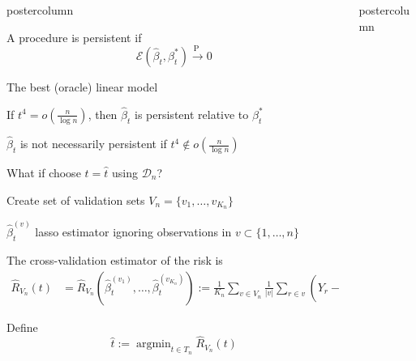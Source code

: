 \documentclass[final]{beamer}
\DeclareMathOperator*{\argmin}{argmin}
\newcommand{\alo}[1]{\textcolor{orangemain}{#1}}
\newcommand{\alr}[1]{\textcolor{redmain}{#1}}
\newcommand{\tCV}{\widehat{t}}
\newcommand{\cvriskN}[2]{\hat{R}_{#1}\left( #2\right)}
\renewcommand{\hat}{\widehat}
\newcommand{\vsp}{\vspace{.2in}}
\newlength{\columnheight}
\begin{document}
\begin{frame}
\begin{columns}
\begin{column}{.49\textwidth}
\begin{beamercolorbox}[center,wd=\textwidth]{postercolumn}
\begin{minipage}[T]{.96\textwidth}
{                \vsp
                A procedure is \alo{persistent} if
                \[
                \mathcal{E}(\hat\beta_t,\beta_t^*) \stackrel{\textrm{P }}{\rightarrow} 0
                \]
            \vsp
            \begin{block}{The best (oracle) linear model}
              
              If $t^4 = o \left(\frac{n}{\log n}
              \right)$, then $\hat\beta_t$ is
              persistent relative to $\beta^*_t$

              \vsp
              $\hat\beta_t$ is \alo{not necessarily}
              persistent if $t^4 \notin o\left(\frac{n}{\log
                    n} \right)$ 
              
              \vsp
              What if  \alr{choose $t=\hat t$ using $\mathcal{D}_n$}?
              \vsp
            \end{block}
            \vfill
            
            
            Create set of \alo{validation sets} $V_n = \{ v_1 , \ldots, v_{K_n} \}$ 
            
            \vsp
            $\hat\beta_t^{(v)}$ lasso estimator ignoring observations in 
            $v \subset \{1,\ldots,n\}$
            \vsp
            
            The \alo{cross-validation estimator of the risk} is
            \vsp
            \begin{align*}
              \cvriskN{V_n}{t} & =
              \cvriskN{V_n}{\hat\beta_t^{(v_1)},\ldots,\hat\beta_t^{(v_{K_n})}}
              := \frac{1}{K_n} \sum_{v \in V_n}
              \frac{1}{|v|} \sum_{r \in v} \left(Y_r - X_r^{\top}\hat\beta_t^{(v)}
              \right)^2
            \end{align*}
            
            \vsp
            Define
            \[
            \tCV := \argmin_{t \in T_n}  \cvriskN{V_n}{t}
            \] 
          }
        \end{minipage}
      \end{beamercolorbox}
    \end{column}
      \begin{column}{.49\textwidth}
        \begin{beamercolorbox}[center,wd=\textwidth]{postercolumn}
          \begin{minipage}[T]{.96\textwidth} 
            \parbox[t][\columnheight]{\textwidth}{
              \vfill
    
}
\end{minipage}
\end{beamercolorbox}
\end{column}
\end{columns}
\end{frame}
\end{document}
